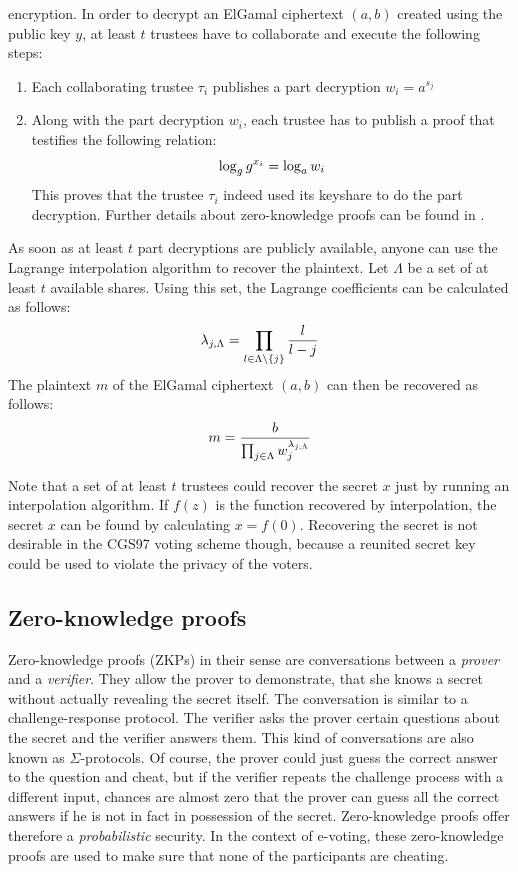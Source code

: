 \documentclass[numbers=noenddot, abstract=on, a4paper, headsepline,
footsepline, oneside, draft=off]{scrreprt}
\begin{document}
encryption. In order to decrypt an ElGamal ciphertext $(a, b)$ created using the
public key $y$, at least $t$ trustees have to collaborate and execute the following steps:
\begin{enumerate}
  \item Each collaborating trustee $\tau_i$ publishes a part decryption $w_i =
  a^{s_j}$
  \item Along with the part decryption $w_i$, each trustee has to publish a
  proof that testifies the following relation:
  \begin{equation}
	\log_g g^{x_i} = \log_a w_i \notag
  \end{equation}
  This proves that the trustee $\tau_i$ indeed used its keyshare to do the part
  decryption. Further details about zero-knowledge proofs can be found in
  .
\end{enumerate}
As soon as at least $t$ part decryptions are publicly available, anyone can use
the Lagrange interpolation algorithm to recover the plaintext. Let $\Lambda$ be a set of
at least $t$ available shares. Using this set, the Lagrange coefficients can be
calculated as follows:
\begin{equation}
	\lambda_{j,\Lambda} = \prod_{l\in \Lambda \backslash \{j\}} \frac{l}{l-j} \notag
\end{equation}
The plaintext $m$ of the ElGamal ciphertext $(a, b)$ can then be recovered as
follows:
\begin{equation}
	m = \frac{b}{\prod_{j \in \Lambda} w_j^{\lambda_{j,\Lambda}}} \notag
\end{equation}

Note that a set of at least $t$ trustees could recover the secret $x$ just
by running an interpolation algorithm. If $f(z)$ is the function recovered by
interpolation, the secret $x$ can be found by calculating $x=f(0)$. Recovering
the secret is not desirable in the CGS97 voting scheme though, because a
reunited secret key could be used to violate the privacy of the voters.

\subsection{Zero-knowledge proofs}
\label{sec:zeroknowledgeproofs}
Zero-knowledge proofs (ZKPs) in their sense are conversations between a
\textit{prover} and a \textit{verifier}. They allow the prover to demonstrate,
that she knows a secret without actually revealing the secret itself. The
conversation is similar to a challenge-response protocol. The verifier asks the
prover certain questions about the secret and the verifier answers them. This
kind of conversations are also known as $\Sigma$-protocols. Of course, the
prover could just guess the correct answer to the question and cheat, but if the
verifier repeats the challenge process with a different input, chances are
almost zero that the prover can guess all the correct answers if he is not in
fact in possession of the secret. Zero-knowledge proofs offer therefore a
\textit{probabilistic} security. In the context of e-voting, these
zero-knowledge proofs are used to make sure that none of the participants are
cheating.
\end{document}
